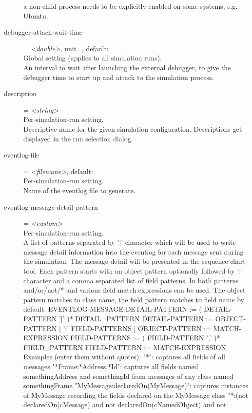 \begin{description}
    a non-child process needs to be explicitly enabled on some systems, e.g.
    Ubuntu.
\item[debugger-attach-wait-time] = \textit{<double>}, unit=, default: \\
    Global setting (applies to all simulation runs).\\
    An interval to wait after launching the external debugger, to give the
    debugger time to start up and attach to the simulation process.
\item[description] = \textit{<string>}\\
    Per-simulation-run setting.\\
    Descriptive name for the given simulation configuration. Descriptions get
    displayed in the run selection dialog.
\item[eventlog-file] = \textit{<filename>}, default: \\
    Per-simulation-run setting.\\
    Name of the eventlog file to generate.
\item[eventlog-message-detail-pattern] = \textit{<custom>}\\
    Per-simulation-run setting.\\
    A list of patterns separated by '|' character which will be used to write
    message detail information into the eventlog for each message sent during
    the simulation. The message detail will be presented in the sequence chart
    tool. Each pattern starts with an object pattern optionally followed by ':'
    character and a comma separated list of field patterns. In both patterns
    and/or/not/* and various field match expressions can be used. The object
    pattern matches to class name, the field pattern matches to field name by
    default.
      EVENTLOG-MESSAGE-DETAIL-PATTERN := ( DETAIL-PATTERN '|' )*
    DETAIL\_PATTERN
      DETAIL-PATTERN := OBJECT-PATTERN [ ':' FIELD-PATTERNS ]
      OBJECT-PATTERN := MATCH-EXPRESSION
      FIELD-PATTERNS := ( FIELD-PATTERN ',' )* FIELD\_PATTERN
      FIELD-PATTERN := MATCH-EXPRESSION
    Examples (enter them without quotes):
      "*": captures all fields of all messages
      "*Frame:*Address,*Id": captures all fields named somethingAddress and
    somethingId from messages of any class named somethingFrame
      "MyMessage:declaredOn(MyMessage)": captures instances of MyMessage
    recording the fields declared on the MyMessage class
      "*:(not declaredOn(cMessage) and not declaredOn(cNamedObject) and not

\end{description}
